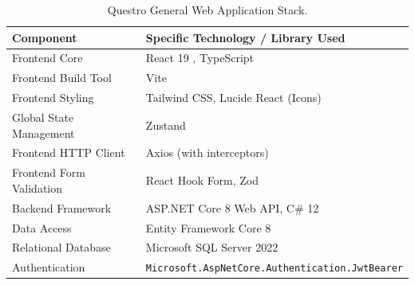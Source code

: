 \begin{table}[H]
    \centering
    \caption{Questro General Web Application Stack.}
    \label{tab:questro_tech_detailed}
    \begin{tabular}{|l|p{8cm}|}
        \hline
        \textbf{Component} & \textbf{Specific Technology / Library Used} \\ \hline
        Frontend Core & React 19 \cite{react_ref}, TypeScript \\ \hline
        Frontend Build Tool & Vite \\ \hline
        Frontend Styling & Tailwind CSS, Lucide React (Icons) \\ \hline
        Global State Management & Zustand \\ \hline
        Frontend HTTP Client & Axios (with interceptors) \\ \hline
        Frontend Form Validation & React Hook Form, Zod \\ \hline
        Backend Framework & ASP.NET Core 8 Web API, C\# 12 \\ \hline
        Data Access & Entity Framework Core 8 \\ \hline
        Relational Database & Microsoft SQL Server 2022 \\ \hline
        Authentication & \texttt{Microsoft.\allowbreak AspNetCore.\allowbreak Authentication.\allowbreak JwtBearer} \\ \hline
    \end{tabular}
\end{table}

